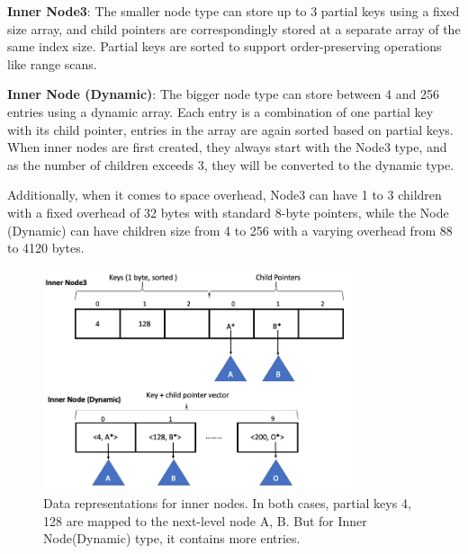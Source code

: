 \documentclass[sigplan,screen,nonacm]{acmart}
\begin{document}
\textbf {Inner Node3}: The smaller node type can store up to 3 partial keys using a fixed size array, and child pointers are correspondingly stored at a separate array of the same index size. Partial keys are sorted to support order-preserving operations like range scans.

\textbf {Inner Node (Dynamic)}: The bigger node type can store between 4 and 256 entries using a dynamic array. Each entry is a combination of one partial key with its child pointer, entries in the array are again sorted based on partial keys. When inner nodes are first created, they always start with the Node3 type, and as the number of children exceeds 3, they will be converted to the dynamic type.  

Additionally, when it comes to space overhead, Node3 can have 1 to 3 children with a fixed overhead of 32 bytes with standard 8-byte pointers, while the Node (Dynamic) can have children size from 4 to 256 with a varying overhead from 88 to 4120 bytes. 
\begin{figure}[t]
  \centering
  \includegraphics[width=\linewidth, height=6.5cm]{pic/inner nodes.png}
  \setlength{\belowcaptionskip}{-7pt} 
  \caption{Data representations for inner nodes. In both cases, partial keys 4, 128 are mapped to the next-level node A, B. But for Inner Node(Dynamic) type, it contains more entries.}
  \label{fig:inner-nodes}
\end{figure}
\end{document}
